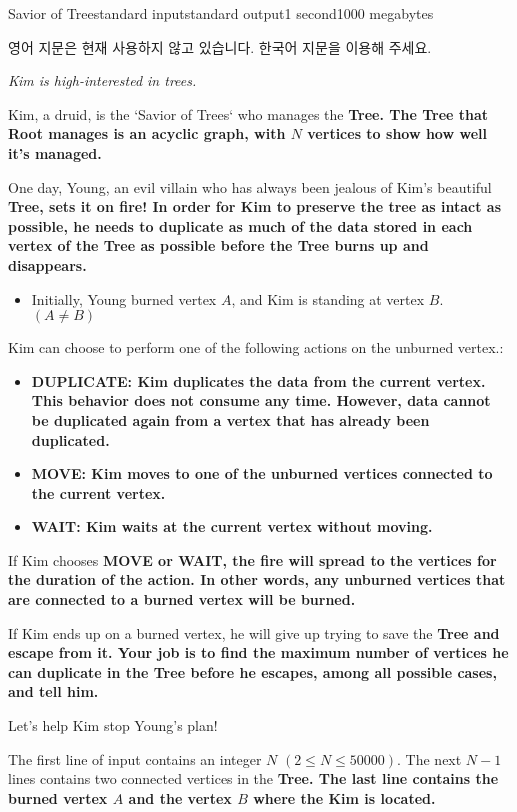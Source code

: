 \begin{problem}{Savior of Tree}{standard input}{standard output}{1 second}{1000 megabytes}

영어 지문은 현재 사용하지 않고 있습니다.
한국어 지문을 이용해 주세요.


  \it{Kim is high-interested in trees.}


Kim, a druid, is the `Savior of Trees` who manages the \bf{Tree}. The \bf{Tree} that Root manages is an acyclic graph, with $N$ vertices to show how well it's managed. 


One day, Young, an evil villain who has always been jealous of Kim's beautiful \bf{Tree}, sets it on fire! In order for Kim to preserve the \bf{tree} as intact as possible, he needs to duplicate as much of the data stored in each vertex of the \bf{Tree} as possible before the \bf{Tree} burns up and disappears.


\begin{itemize}
  \item Initially, Young burned vertex $A$, and Kim is standing at vertex $B$. $(A \neq B)$
\end{itemize}


Kim can choose to perform one of the following actions on the unburned vertex.:


\begin{itemize}
  \item \bf{DUPLICATE}: Kim duplicates the data from the current vertex. This behavior does not consume any time. However, data cannot be duplicated again from a vertex that has already been duplicated.
  \item \bf{MOVE}: Kim moves to one of the unburned vertices connected to the current vertex.
  \item \bf{WAIT}: Kim waits at the current vertex without moving.
\end{itemize}


If Kim chooses \bf{MOVE} or \bf{WAIT}, the fire will spread to the vertices for the duration of the action. In other words, any unburned vertices that are connected to a burned vertex will be burned.


If Kim ends up on a burned vertex, he will give up trying to save the \bf{Tree} and escape from it. Your job is to find the maximum number of vertices he can duplicate in the \bf{Tree} before he escapes, among all possible cases, and tell him.


Let's help Kim stop Young's plan!

\InputFile
The first line of input contains an integer $N$ $(2 \leq N \leq 50000)$.
The next $N-1$ lines contains two connected vertices in the \bf{Tree}.
The last line contains the burned vertex $A$ and the vertex $B$ where the Kim is located.


\end{problem}
